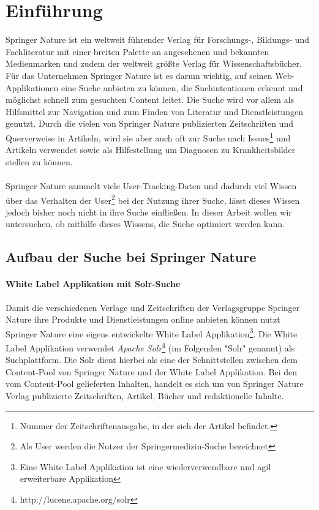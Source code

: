 %
\chapter{Einführung}
\label{sec:Einfuehrung}

Springer Nature ist ein weltweit führender Verlag für Forschungs-, Bildungs- und Fachliteratur mit einer breiten Palette an angesehenen und bekannten Medienmarken und zudem der weltweit größte Verlag für Wissenschaftsbücher. Für das Unternehmen Springer Nature ist es darum wichtig, auf seinen Web-Applikationen eine Suche anbieten zu können, die Suchintentionen erkennt und möglichst schnell zum gesuchten Content leitet. Die Suche wird vor allem als Hilfsmittel zur Navigation und zum Finden von Literatur und Dienstleistungen genutzt. Durch die vielen von Springer Nature publizierten Zeitschriften und Querverweise in Artikeln, wird sie aber auch oft zur Suche nach Issues\footnote{Nummer der Zeitschriftenausgabe, in der sich der Artikel befindet.} und Artikeln verwendet sowie als Hilfestellung um Diagnosen zu Krankheitsbilder stellen zu können.
\\
\\
Springer Nature sammelt viele User-Tracking-Daten und dadurch viel Wissen über das Verhalten der User\footnote{Als User werden die Nutzer der Springermedizin-Suche bezeichnet} bei der Nutzung ihrer Suche, lässt dieses Wissen jedoch bisher noch nicht in ihre Suche einfließen. In dieser Arbeit wollen wir untersuchen, ob mithilfe dieses Wissens, die Suche optimiert werden kann.

\section{Aufbau der Suche bei Springer Nature}
\label{sec:Einfuehrung:AufbauSucheBeiSpringerNature}

\subsubsection{White Label Applikation mit Solr-Suche}
\label{sec:Einfuehrung:AufbauSucheBeiSpringerNature:WhiteLabelApplikationSolr-Suche}

Damit die verschiedenen Verlage und Zeitschriften der Verlagsgruppe Springer Nature ihre Produkte und Dienstleistungen online anbieten können nutzt Springer Nature eine eigens entwickelte White Label Applikation\footnote{Eine White Label Applikation ist eine wiederverwendbare und agil erweiterbare Applikation}. Die White Label Applikation verwendet \textit{Apache Solr}\footnote{http://lucene.apache.org/solr} (im Folgenden "Solr" genannt) als Suchplattform. Die Solr dient hierbei als eine der Schnittstellen zwischen dem Content-Pool von Springer Nature und der White Label Applikation. Bei den vom Content-Pool gelieferten Inhalten, handelt es sich um von Springer Nature Verlag publizierte Zeitschriften, Artikel, Bücher und redaktionelle Inhalte.

